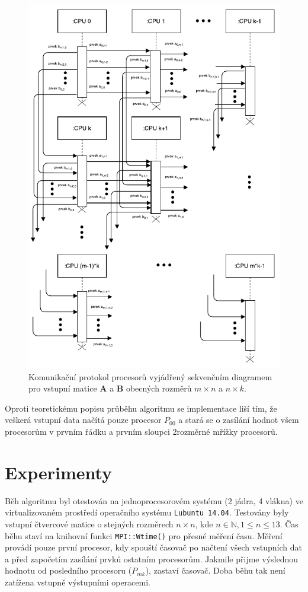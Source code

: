 \documentclass[12pt,a4paper,titlepage,final]{article}
\newcommand{\matr}[1]{\mathbf{#1}}
\begin{document}
\begin{figure}[!hbt]
	\centering
	\includegraphics[width=0.75\linewidth]{img/sequence_diagram.pdf}
	\caption{Komunikační protokol procesorů vyjádřený sekvenčním diagramem pro vstupní matice $\matr{A}$ a $\matr{B}$ obecných rozměrů $m \times n$ a $n \times k$.}
	\label{fig:SequenceDiagram}
\end{figure}

Oproti teoretickému popisu průběhu algoritmu se implementace liší tím, že veškerá vstupní data načítá pouze procesor $P_{00}$ a stará se o zasílání hodnot všem procesorům v prvním řádku a prvním sloupci 2rozměrné mřížky procesorů.

\section{Experimenty}
Běh algoritmu byl otestován na jednoprocesorovém systému (2 jádra, 4 vlákna) ve virtualizovaném prostředí operačního systému \texttt{Lubuntu 14.04}. Testovány byly vstupní čtvercové matice o stejných rozměrech $n \times n$, kde $n \in \mathbb{N}, 1 \leq n \leq 13$. Čas běhu staví na knihovní funkci \texttt{MPI::Wtime()} pro přesné měření času. Měření provádí pouze první procesor, kdy spouští časovač po načtení všech vstupních dat a před započetím zasílání prvků ostatním procesorům. Jakmile přijme výslednou hodnotu od posledního procesoru ($P_{mk}$), zastaví časovač. Doba běhu tak není zatížena vstupně výstupními operacemi.
\end{document}
